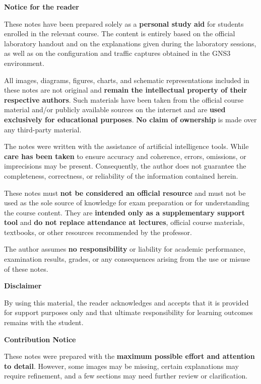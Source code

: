 \documentclass[11pt,a4paper,openany]{report}
\begin{document}
\begin{notebox}
\textbf{Notice for the reader}\par
These notes have been prepared solely as a \textbf{personal study aid} for students enrolled in the relevant course. The content is entirely based on the official laboratory handout and on the explanations given during the laboratory sessions, as well as on the configuration and traffic captures obtained in the GNS3 environment.

All images, diagrams, figures, charts, and schematic representations included in these notes are not original and \textbf{remain the intellectual property of their respective authors}. Such materials have been taken from the official course material and/or publicly available sources on the internet and are \textbf{used exclusively for educational purposes}. \textbf{No claim of ownership} is made over any third-party material.

The notes were written with the assistance of artificial intelligence tools. While \textbf{care has been taken} to ensure accuracy and coherence, errors, omissions, or imprecisions may be present. Consequently, the author does not guarantee the completeness, correctness, or reliability of the information contained herein.

These notes must \textbf{not be considered an official resource} and must not be used as the sole source of knowledge for exam preparation or for understanding the course content. They are \textbf{intended only as a supplementary support tool} and \textbf{do not replace attendance at lectures}, official course materials, textbooks, or other resources recommended by the professor.

The author assumes \textbf{no responsibility} or liability for academic performance, examination results, grades, or any consequences arising from the use or misuse of these notes.
\end{notebox}

\begin{notebox}
\textbf{Disclaimer}\par
By using this material, the reader acknowledges and accepts that it is provided for support purposes only and that ultimate responsibility for learning outcomes remains with the student.
\end{notebox}

\begin{notebox}
\textbf{Contribution Notice}\par
These notes were prepared with the \textbf{maximum possible effort and attention to detail}. However, some images may be missing, certain explanations may require refinement, and a few sections may need further review or clarification.
\end{notebox}
\end{document}
